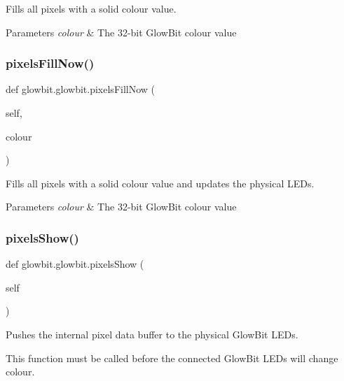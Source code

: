 Fills all pixels with a solid colour value. 


\begin{DoxyParams}{Parameters}
{\em colour} & The 32-\/bit Glow\+Bit colour value \\
\hline
\end{DoxyParams}
\mbox{\label{classglowbit_1_1glowbit_a2aae728fcc6e8cdfe5c745ac0a7d308d}} 
\subsubsection{\texorpdfstring{pixels\+Fill\+Now()}{pixelsFillNow()}}
{\footnotesize\ttfamily def glowbit.\+glowbit.\+pixels\+Fill\+Now (\begin{DoxyParamCaption}\item[{}]{self,  }\item[{}]{colour }\end{DoxyParamCaption})}



Fills all pixels with a solid colour value and updates the physical L\+E\+Ds. 


\begin{DoxyParams}{Parameters}
{\em colour} & The 32-\/bit Glow\+Bit colour value \\
\hline
\end{DoxyParams}
\mbox{\label{classglowbit_1_1glowbit_a051aed2a4969fdcb0466e4e840209279}} 
\subsubsection{\texorpdfstring{pixels\+Show()}{pixelsShow()}}
{\footnotesize\ttfamily def glowbit.\+glowbit.\+pixels\+Show (\begin{DoxyParamCaption}\item[{}]{self }\end{DoxyParamCaption})}



Pushes the internal pixel data buffer to the physical Glow\+Bit L\+E\+Ds. 

This function must be called before the connected Glow\+Bit L\+E\+Ds will change colour.

